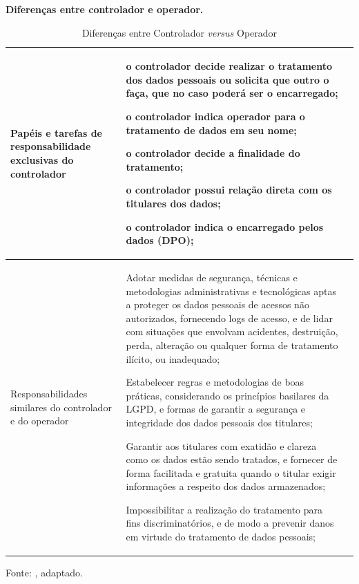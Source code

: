 \documentclass[
	12pt,				%
	openright,			%
	oneside,			%
	a4paper,			%
	english,			%
	french,				%
	spanish,			%
	brazil,				%
	]{abntex2}
\begin{document}
\begin{table}[ht]
    \centering
    \caption{Diferenças entre Controlador \textit{versus} Operador}
    \label{tab: Diferenças entre controlador e operador}
    \textbf{Diferenças entre controlador e operador.}  \\ 

    \begin{tabular}{|p{4 cm}|p{11.5cm}|p{0cm}|} 
        \hline

Papéis e tarefas de responsabilidade exclusivas do controlador
&
\begin{tabitemize}
\item o controlador decide realizar o tratamento dos dados pessoais ou solicita que outro o faça, que no caso poderá ser o encarregado;
\item o controlador indica operador para o tratamento de dados em seu nome;
\item o controlador decide a finalidade do tratamento;
\item o controlador possui relação direta com os titulares dos dados;
\item o controlador indica o encarregado pelos dados (DPO);
\end{tabitemize}\\ \hline

Responsabilidades similares do controlador e do operador
&
\begin{tabitemize}
\item Adotar medidas de segurança, técnicas e metodologias administrativas e tecnológicas aptas a proteger os dados pessoais de acessos não autorizados, fornecendo logs de acesso, e de lidar com situações que envolvam acidentes, destruição, perda, alteração ou qualquer forma de tratamento ilícito, ou inadequado;

\item Estabelecer regras e metodologias de boas práticas, considerando os princípios basilares da LGPD, e formas de garantir a segurança e integridade dos dados pessoais dos titulares;

\item Garantir aos titulares com exatidão e clareza como os dados estão sendo tratados, e fornecer de forma facilitada e gratuita quando o titular exigir informações a respeito dos dados armazenados;

\item Impossibilitar a realização do tratamento para fins discriminatórios, e de modo a prevenir danos em virtude do tratamento de dados pessoais;

\end{tabitemize}\\ \hline
 
    \end{tabular}
    \newline \newline Fonte: \cite{Alves2020}, adaptado.
\end{table}
\end{document}
